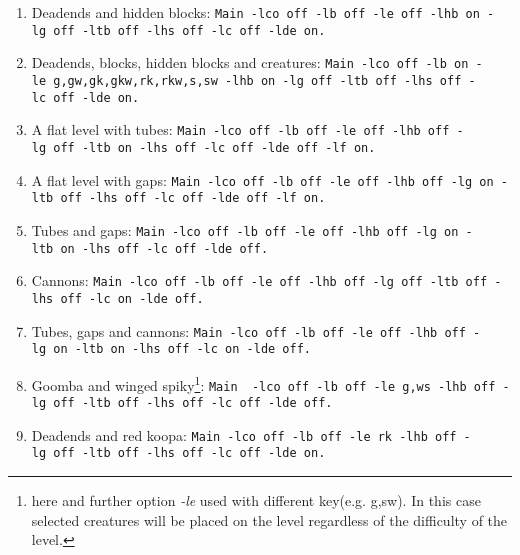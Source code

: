 \documentclass{report}
\begin{document}
\begin{enumerate}
\item Deadends and hidden blocks:\newline %
\texttt{Main~-lco~off~-lb~off~-le~off~-lhb~on~-lg~off~-ltb~off~-lhs~off~-lc~off~-lde~on.}
\item Deadends, blocks, hidden blocks and creatures:\newline %
\texttt{Main~-lco~off~-lb~on~-le~g,gw,gk,gkw,rk,rkw,s,sw~-lhb~on~-lg~off~-ltb~off~-lhs~off~-lc~off~-lde~on.}
\item A flat level with tubes: \newline %
\texttt{Main~-lco~off~-lb~off~-le~off~-lhb~off~-lg~off~-ltb~on~-lhs~off~-lc~off~-lde~off~-lf~on.}
\item A flat level with gaps: \newline %
\texttt{Main~-lco~off~-lb~off~-le~off~-lhb~off~-lg~on~-ltb~off~-lhs~off~-lc~off~-lde~off~-lf~on.}
\item Tubes and gaps: \newline %
\texttt{Main~-lco~off~-lb~off~-le~off~-lhb~off~-lg~on~-ltb~on~-lhs~off~-lc~off~-lde~off.}
\item Cannons: \newline %
\texttt{Main~-lco~off~-lb~off~-le~off~-lhb~off~-lg~off~-ltb~off~-lhs~off~-lc~on~-lde~off.}
\item Tubes, gaps and cannons: \newline %
\texttt{Main~-lco~off~-lb~off~-le~off~-lhb~off~-lg~on~-ltb~on~-lhs~off~-lc~on~-lde~off.}
\item Goomba and winged spiky\footnote{here and further option \emph{-le} used with different key(e.g. g,sw). In this case selected creatures will be placed on the level regardless of the difficulty of the level.}: \newline %
\texttt{Main ~-lco~off~-lb~off~-le~g,ws~-lhb~off~-lg~off~-ltb~off~-lhs~off~-lc~off~-lde~off.}
\item Deadends and red koopa: \newline %
\texttt{Main~-lco~off~-lb~off~-le~rk~-lhb~off~-lg~off~-ltb~off~-lhs~off~-lc~off~-lde~on.}


\end{enumerate}
\end{document}

